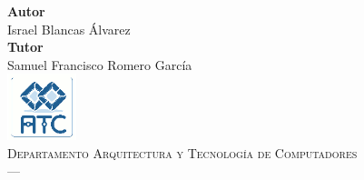 \begin{titlepage}
\begin{minipage}{\textwidth}
\textbf{Autor}\\ {Israel Blancas Álvarez}\\[2.5ex]
\textbf{Tutor}\\
{Samuel Francisco Romero García}\\[2.5cm]
\includegraphics[width=0.15\textwidth]{imagenes/atc.png}\\[0.1cm]
\textsc{Departamento Arquitectura y Tecnología de Computadores}\\
\textsc{---}\\
\end{minipage}
\addtolength{\textwidth}{\centeroffset}


\end{titlepage}
